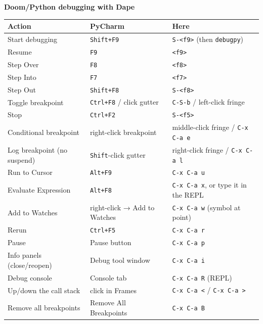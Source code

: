 \documentclass[11pt]{article}
\newcommand{\key}[1]{\texttt{#1}}
\begin{document}
{\fontsize{16}{19}\selectfont\bfseries Doom/Python debugging with Dape\par}
\vspace{8pt}

\begin{tabular*}{\textwidth}{@{\extracolsep{\fill}}lll@{}}
\toprule
\textbf{Action}             & \textbf{PyCharm}              & \textbf{Here} \\
\midrule
Start debugging             & \key{Shift+F9}                  & \key{S-<f9>} (then \key{debugpy}) \\
Resume                      & \key{F9}                        & \key{<f9>} \\
Step Over                   & \key{F8}                        & \key{<f8>} \\
Step Into                   & \key{F7}                        & \key{<f7>} \\
Step Out                    & \key{Shift+F8}                  & \key{S-<f8>} \\
Toggle breakpoint           & \key{Ctrl+F8} / click gutter    & \key{C-S-b} / left-click fringe \\
Stop                        & \key{Ctrl+F2}                   & \key{S-<f5>} \\
Conditional breakpoint      & right-click breakpoint        & middle-click fringe / \key{C-x C-a e} \\
Log breakpoint (no suspend) & \key{Shift}-click gutter        & right-click fringe / \key{C-x C-a l} \\
Run to Cursor               & \key{Alt+F9}                    & \key{C-x C-a u} \\
Evaluate Expression         & \key{Alt+F8}                    & \key{C-x C-a x}, or type it in the REPL \\
Add to Watches              & right-click → Add to Watches  & \key{C-x C-a w} (symbol at point) \\
Rerun                       & \key{Ctrl+F5}                   & \key{C-x C-a r} \\
Pause                       & Pause button                  & \key{C-x C-a p} \\
Info panels (close/reopen)  & Debug tool window             & \key{C-x C-a i} \\
Debug console               & Console tab                   & \key{C-x C-a R} (REPL) \\
Up/down the call stack      & click in Frames               & \key{C-x C-a <} / \key{C-x C-a >} \\
Remove all breakpoints      & Remove All Breakpoints        & \key{C-x C-a B} \\
\bottomrule
\end{tabular*}
\end{document}
